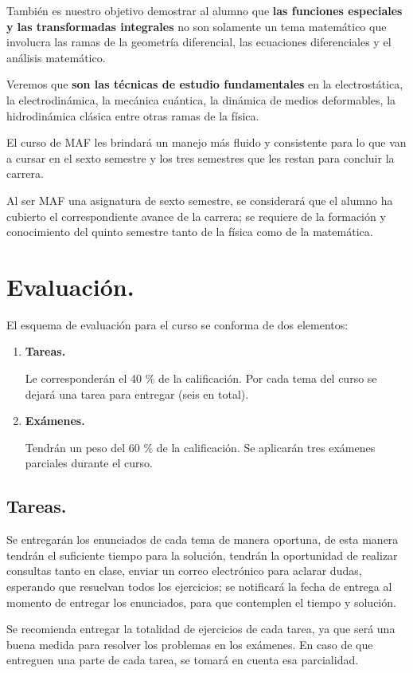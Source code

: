 \documentclass[12pt]{article}
\numberwithin{equation}{section}
\begin{document}
También es nuestro objetivo demostrar al alumno que \textbf{las funciones especiales y las transformadas integrales} no son solamente un tema matemático que involucra las ramas de la geometría diferencial, las ecuaciones diferenciales y el análisis matemático.
\par
Veremos que \textbf{son las técnicas de estudio fundamentales} en la electrostática, la electrodinámica, la mecánica cuántica, la dinámica de medios deformables, la hidrodinámica clásica entre otras ramas de la física.
\par
El curso de MAF les brindará un manejo más fluido y consistente para lo que van a cursar en el sexto semestre y los tres semestres que les restan para concluir la carrera.
\par
Al ser MAF una asignatura de sexto semestre, se considerará que el alumno ha cubierto el correspondiente avance de la carrera; se requiere de la formación y conocimiento del quinto semestre tanto de la física como de la matemática.

\section{Evaluación.}

El esquema de evaluación para el curso se conforma de dos elementos:
\begin{enumerate}[label=\alph*)]
\item \textbf{Tareas.}

Le corresponderán el \num{40} \% de la calificación. Por cada tema del curso se dejará una tarea para entregar (seis en total).
\item \textbf{Exámenes.}

Tendrán un peso del \num{60} \% de la calificación. Se aplicarán tres exámenes parciales durante el curso.
\end{enumerate}

\subsection{Tareas.}

Se entregarán los enunciados de cada tema de manera oportuna, de esta manera tendrán el suficiente tiempo para la solución, tendrán la oportunidad de realizar consultas tanto en clase, enviar un correo electrónico para aclarar dudas, esperando que resuelvan todos los ejercicios; se notificará la fecha de entrega al momento de entregar los enunciados, para que contemplen el tiempo y solución.
\par
Se recomienda entregar la totalidad de ejercicios de cada tarea, ya que será una buena medida para resolver los problemas en los exámenes. En caso de que entreguen una parte de cada tarea, se tomará en cuenta esa parcialidad.
\end{document}
